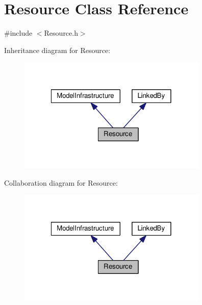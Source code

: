 \hypertarget{class_resource}{\section{Resource Class Reference}
\label{class_resource}
}


{\ttfamily \#include $<$Resource.\-h$>$}



Inheritance diagram for Resource\-:
\nopagebreak
\begin{figure}[H]
\begin{center}
\leavevmode
\includegraphics[width=255pt]{class_resource__inherit__graph}
\end{center}
\end{figure}


Collaboration diagram for Resource\-:
\nopagebreak
\begin{figure}[H]
\begin{center}
\leavevmode
\includegraphics[width=255pt]{class_resource__coll__graph}
\end{center}
\end{figure}
